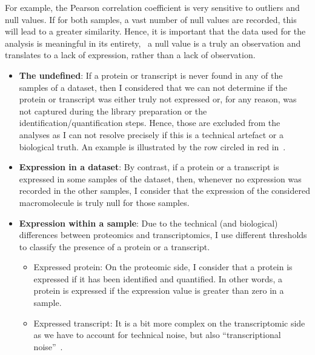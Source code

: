 For example, the Pearson correlation coefficient is very
sensitive to outliers and null values. If for both samples, a vast number of
null values are recorded, this will lead to a greater similarity.
Hence, it is important that the data used for the analysis is meaningful in
its entirety, \ie\ a null value is a truly an observation and translates to
a lack of expression, rather than a lack of observation.

\begin{itemize}
        \item\textbf{The undefined}:\label{subsec:ExpressedOrNot-undefined} %
        If a protein or transcript is never found in any of the samples of a dataset,
        then I considered that we can not determine if the protein or transcript was
        either truly not expressed or, for any reason, was not captured during the library
        preparation or the identification/quantification steps. Hence, those are
        excluded from the analyses as I can not resolve precisely if this is a
        technical artefact or a biological truth. An example is illustrated by the row
        circled in red in~.
        \item\textbf{Expression in a dataset}:\label{subsec:ExpressedOrNot--expDataset} %
        By contrast, if a protein or a transcript is expressed in some samples of the
        dataset, then, whenever no expression was recorded in the other
        samples, I consider that the expression of the considered macromolecule is truly
        null for those samples.
        \item\textbf{Expression within a sample}:
        Due to the technical (and biological) differences between proteomics and
        transcriptomics, I use different thresholds to classify the presence of
        a protein or a transcript.
        \begin{itemize}
                \item\textsf{Expressed protein}:
                On the proteomic side, I consider that a protein is expressed
                if it has been identified and quantified.
                In other words, a protein is expressed
                if the expression value is greater than zero in a sample.
                \item\textsf{Expressed transcript}:\label{subsubsec:exprTrans} %
                It is a bit more complex on the transcriptomic side as
                we have to account for technical noise,
                but also \enquote{transcriptional noise}~.

\end{itemize}
\end{itemize}
